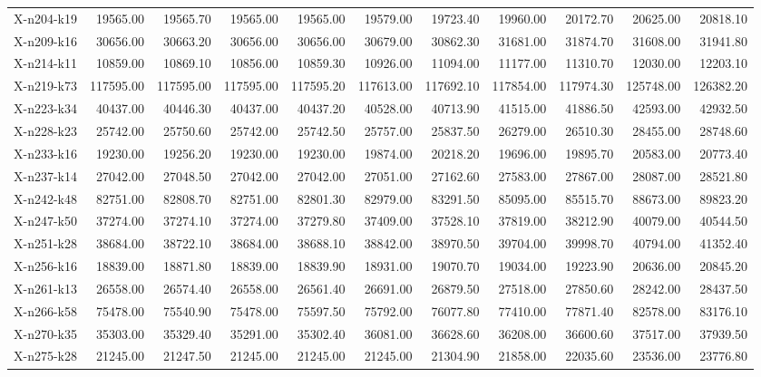 \documentclass[letterpaper]{article} %
\begin{document}
\begin{landscape}
\begin{longtable}{@{}l rr rr rr rr rr@{}}
X-n204-k19 & 19565.00 & 19565.70 & 19565.00 & 19565.00 & 19579.00 & 19723.40 & 19960.00 & 20172.70 & 20625.00 & 20818.10 \\
X-n209-k16 & 30656.00 & 30663.20 & 30656.00 & 30656.00 & 30679.00 & 30862.30 & 31681.00 & 31874.70 & 31608.00 & 31941.80 \\
X-n214-k11 & 10859.00 & 10869.10 & 10856.00 & 10859.30 & 10926.00 & 11094.00 & 11177.00 & 11310.70 & 12030.00 & 12203.10 \\
X-n219-k73 & 117595.00 & 117595.00 & 117595.00 & 117595.20 & 117613.00 & 117692.10 & 117854.00 & 117974.30 & 125748.00 & 126382.20 \\
X-n223-k34 & 40437.00 & 40446.30 & 40437.00 & 40437.20 & 40528.00 & 40713.90 & 41515.00 & 41886.50 & 42593.00 & 42932.50 \\
X-n228-k23 & 25742.00 & 25750.60 & 25742.00 & 25742.50 & 25757.00 & 25837.50 & 26279.00 & 26510.30 & 28455.00 & 28748.60 \\
X-n233-k16 & 19230.00 & 19256.20 & 19230.00 & 19230.00 & 19874.00 & 20218.20 & 19696.00 & 19895.70 & 20583.00 & 20773.40 \\
X-n237-k14 & 27042.00 & 27048.50 & 27042.00 & 27042.00 & 27051.00 & 27162.60 & 27583.00 & 27867.00 & 28087.00 & 28521.80 \\
X-n242-k48 & 82751.00 & 82808.70 & 82751.00 & 82801.30 & 82979.00 & 83291.50 & 85095.00 & 85515.70 & 88673.00 & 89823.20 \\
X-n247-k50 & 37274.00 & 37274.10 & 37274.00 & 37279.80 & 37409.00 & 37528.10 & 37819.00 & 38212.90 & 40079.00 & 40544.50 \\
X-n251-k28 & 38684.00 & 38722.10 & 38684.00 & 38688.10 & 38842.00 & 38970.50 & 39704.00 & 39998.70 & 40794.00 & 41352.40 \\
X-n256-k16 & 18839.00 & 18871.80 & 18839.00 & 18839.90 & 18931.00 & 19070.70 & 19034.00 & 19223.90 & 20636.00 & 20845.20 \\
X-n261-k13 & 26558.00 & 26574.40 & 26558.00 & 26561.40 & 26691.00 & 26879.50 & 27518.00 & 27850.60 & 28242.00 & 28437.50 \\
X-n266-k58 & 75478.00 & 75540.90 & 75478.00 & 75597.50 & 75792.00 & 76077.80 & 77410.00 & 77871.40 & 82578.00 & 83176.10 \\
X-n270-k35 & 35303.00 & 35329.40 & 35291.00 & 35302.40 & 36081.00 & 36628.60 & 36208.00 & 36600.60 & 37517.00 & 37939.50 \\
X-n275-k28 & 21245.00 & 21247.50 & 21245.00 & 21245.00 & 21245.00 & 21304.90 & 21858.00 & 22035.60 & 23536.00 & 23776.80 \\

\end{longtable}
\end{landscape}
\end{document}
